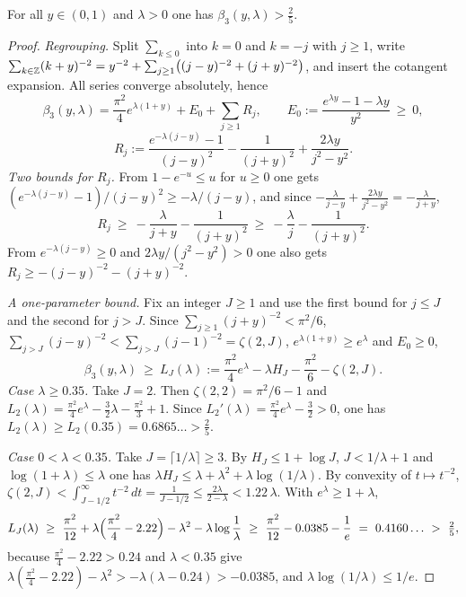 \begin{lemma}[Reserve]\label{lem:beta3-reserve}
For all $y\in(0,1)$ and $\lambda>0$ one has $\beta_3(y,\lambda)>\tfrac25$.
\end{lemma}
\begin{proof}
\emph{Regrouping.} Split $\sum_{k\le0}$ into $k=0$ and $k=-j$ with $j\ge1$, write $\sum_{k\in\mathbb{Z}}(k+y)^{-2}=y^{-2}+\sum_{j\ge1}\bigl((j-y)^{-2}+(j+y)^{-2}\bigr)$, and insert the cotangent expansion. All series converge absolutely, hence
\[
\beta_3(y,\lambda)=\frac{\pi^2}{4}e^{\lambda(1+y)}+E_0+\sum_{j\ge1}R_j,
\qquad
E_0:=\frac{e^{\lambda y}-1-\lambda y}{y^2}\ \ge\ 0,
\]
\[
R_j:=\frac{e^{-\lambda(j-y)}-1}{(j-y)^2}-\frac{1}{(j+y)^2}+\frac{2\lambda y}{j^2-y^2}.
\]
\emph{Two bounds for $R_j$.} From $1-e^{-u}\le u$ for $u\ge0$ one gets $(e^{-\lambda(j-y)}-1)/(j-y)^2\ge-\lambda/(j-y)$, and since $-\frac{\lambda}{j-y}+\frac{2\lambda y}{j^2-y^2}=-\frac{\lambda}{j+y}$,
\[
R_j\ \ge\ -\frac{\lambda}{j+y}-\frac{1}{(j+y)^2}\ \ge\ -\frac{\lambda}{j}-\frac{1}{(j+y)^2}.
\]
From $e^{-\lambda(j-y)}\ge0$ and $2\lambda y/(j^2-y^2)>0$ one also gets $R_j\ge-(j-y)^{-2}-(j+y)^{-2}$.

\emph{A one-parameter bound.} Fix an integer $J\ge1$ and use the first bound for $j\le J$ and the second for $j>J$. Since $\sum_{j\ge1}(j+y)^{-2}<\pi^2/6$, $\sum_{j>J}(j-y)^{-2}<\sum_{j>J}(j-1)^{-2}=\zeta(2,J)$, $e^{\lambda(1+y)}\ge e^{\lambda}$ and $E_0\ge0$,
\[
\beta_3(y,\lambda)\ \ge\ L_J(\lambda):=\frac{\pi^2}{4}e^{\lambda}-\lambda H_J-\frac{\pi^2}{6}-\zeta(2,J).
\]
\emph{Case $\lambda\ge0.35$.} Take $J=2$. Then $\zeta(2,2)=\pi^2/6-1$ and $L_2(\lambda)=\frac{\pi^2}{4}e^{\lambda}-\frac32\lambda-\frac{\pi^2}{3}+1$. Since $L_2'(\lambda)=\frac{\pi^2}{4}e^{\lambda}-\frac32>0$, one has $L_2(\lambda)\ge L_2(0.35)=0.6865\ldots>\tfrac25$.

\emph{Case $0<\lambda<0.35$.} Take $J=\lceil1/\lambda\rceil\ge3$. By $H_J\le1+\log J$, $J<1/\lambda+1$ and $\log(1+\lambda)\le\lambda$ one has $\lambda H_J\le\lambda+\lambda^2+\lambda\log(1/\lambda)$. By convexity of $t\mapsto t^{-2}$, $\zeta(2,J)<\int_{J-1/2}^{\infty}t^{-2}\,dt=\frac{1}{J-1/2}\le\frac{2\lambda}{2-\lambda}<1.22\,\lambda$. With $e^{\lambda}\ge1+\lambda$,
\[
L_J(\lambda)\ \ge\ \frac{\pi^2}{12}+\lambda\Bigl(\frac{\pi^2}{4}-2.22\Bigr)-\lambda^2-\lambda\log\frac1\lambda
\ \ge\ \frac{\pi^2}{12}-0.0385-\frac1e\ =\ 0.4160\ldots\ >\ \tfrac25,
\]
because $\frac{\pi^2}{4}-2.22>0.24$ and $\lambda<0.35$ give $\lambda(\frac{\pi^2}{4}-2.22)-\lambda^2>-\lambda(\lambda-0.24)>-0.0385$, and $\lambda\log(1/\lambda)\le 1/e$.
\end{proof}

